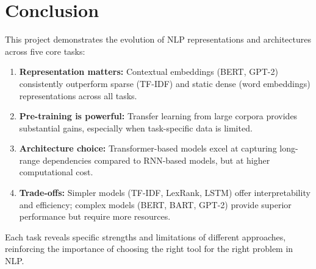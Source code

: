 \documentclass[12pt, a4paper]{article}
\begin{document}
\section{Conclusion}

This project demonstrates the evolution of NLP representations and architectures across five core tasks:

\begin{enumerate}
    \item \textbf{Representation matters:} Contextual embeddings (BERT, GPT-2) consistently outperform sparse (TF-IDF) and static dense (word embeddings) representations across all tasks.
    \item \textbf{Pre-training is powerful:} Transfer learning from large corpora provides substantial gains, especially when task-specific data is limited.
    \item \textbf{Architecture choice:} Transformer-based models excel at capturing long-range dependencies compared to RNN-based models, but at higher computational cost.
    \item \textbf{Trade-offs:} Simpler models (TF-IDF, LexRank, LSTM) offer interpretability and efficiency; complex models (BERT, BART, GPT-2) provide superior performance but require more resources.
\end{enumerate}

Each task reveals specific strengths and limitations of different approaches, reinforcing the importance of choosing the right tool for the right problem in NLP.
\end{document}
